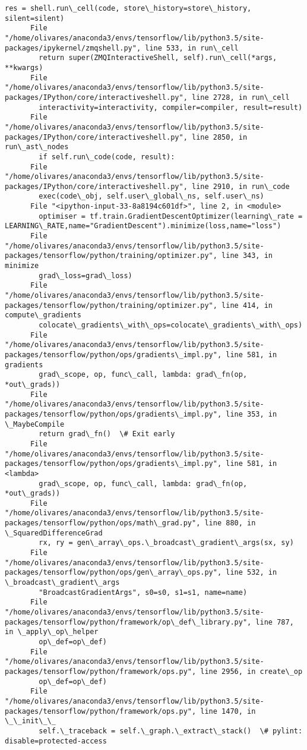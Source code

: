 \documentclass[11pt]{article}
\begin{document}
\begin{Verbatim}[commandchars=\\\{\}]
        res = shell.run\_cell(code, store\_history=store\_history, silent=silent)
      File "/home/olivares/anaconda3/envs/tensorflow/lib/python3.5/site-packages/ipykernel/zmqshell.py", line 533, in run\_cell
        return super(ZMQInteractiveShell, self).run\_cell(*args, **kwargs)
      File "/home/olivares/anaconda3/envs/tensorflow/lib/python3.5/site-packages/IPython/core/interactiveshell.py", line 2728, in run\_cell
        interactivity=interactivity, compiler=compiler, result=result)
      File "/home/olivares/anaconda3/envs/tensorflow/lib/python3.5/site-packages/IPython/core/interactiveshell.py", line 2850, in run\_ast\_nodes
        if self.run\_code(code, result):
      File "/home/olivares/anaconda3/envs/tensorflow/lib/python3.5/site-packages/IPython/core/interactiveshell.py", line 2910, in run\_code
        exec(code\_obj, self.user\_global\_ns, self.user\_ns)
      File "<ipython-input-33-8a8194c601df>", line 2, in <module>
        optimiser = tf.train.GradientDescentOptimizer(learning\_rate = LEARNING\_RATE,name="GradientDescent").minimize(loss,name="loss")
      File "/home/olivares/anaconda3/envs/tensorflow/lib/python3.5/site-packages/tensorflow/python/training/optimizer.py", line 343, in minimize
        grad\_loss=grad\_loss)
      File "/home/olivares/anaconda3/envs/tensorflow/lib/python3.5/site-packages/tensorflow/python/training/optimizer.py", line 414, in compute\_gradients
        colocate\_gradients\_with\_ops=colocate\_gradients\_with\_ops)
      File "/home/olivares/anaconda3/envs/tensorflow/lib/python3.5/site-packages/tensorflow/python/ops/gradients\_impl.py", line 581, in gradients
        grad\_scope, op, func\_call, lambda: grad\_fn(op, *out\_grads))
      File "/home/olivares/anaconda3/envs/tensorflow/lib/python3.5/site-packages/tensorflow/python/ops/gradients\_impl.py", line 353, in \_MaybeCompile
        return grad\_fn()  \# Exit early
      File "/home/olivares/anaconda3/envs/tensorflow/lib/python3.5/site-packages/tensorflow/python/ops/gradients\_impl.py", line 581, in <lambda>
        grad\_scope, op, func\_call, lambda: grad\_fn(op, *out\_grads))
      File "/home/olivares/anaconda3/envs/tensorflow/lib/python3.5/site-packages/tensorflow/python/ops/math\_grad.py", line 880, in \_SquaredDifferenceGrad
        rx, ry = gen\_array\_ops.\_broadcast\_gradient\_args(sx, sy)
      File "/home/olivares/anaconda3/envs/tensorflow/lib/python3.5/site-packages/tensorflow/python/ops/gen\_array\_ops.py", line 532, in \_broadcast\_gradient\_args
        "BroadcastGradientArgs", s0=s0, s1=s1, name=name)
      File "/home/olivares/anaconda3/envs/tensorflow/lib/python3.5/site-packages/tensorflow/python/framework/op\_def\_library.py", line 787, in \_apply\_op\_helper
        op\_def=op\_def)
      File "/home/olivares/anaconda3/envs/tensorflow/lib/python3.5/site-packages/tensorflow/python/framework/ops.py", line 2956, in create\_op
        op\_def=op\_def)
      File "/home/olivares/anaconda3/envs/tensorflow/lib/python3.5/site-packages/tensorflow/python/framework/ops.py", line 1470, in \_\_init\_\_
        self.\_traceback = self.\_graph.\_extract\_stack()  \# pylint: disable=protected-access
    

\end{Verbatim}
\end{document}
